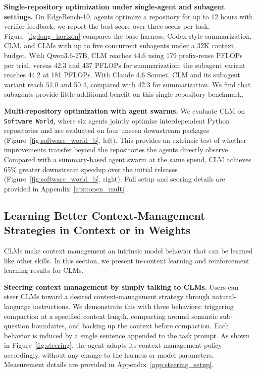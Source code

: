 \documentclass{fairmeta}
\newcommand{\clmhl}[1]{\textcolor{clmblue}{\textbf{#1}}}
\newcommand{\ours}{CLM\xspace}
\newcommand{\oursplural}{CLMs\xspace}
\begin{document}
\textbf{Single-repository optimization under single-agent and subagent settings.}
On EdgeBench-10, agents optimize a repository for up to 12 hours with verifier feedback; we report the best score over three seeds per task. Figure~\ref{fig:long_horizon} compares the base harness, Codex-style summarization, \ours{}, and \oursplural{} with up to five concurrent subagents under a 32K context budget. With Qwen3.6-27B, \ours{} reaches 44.6 using 179 prefix-reuse PFLOPs per trial, versus 42.3 and 437 PFLOPs for summarization; the subagent variant reaches 44.2 at 181 PFLOPs. With Claude 4.6 Sonnet, \ours{} and its subagent variant reach 51.0 and 50.4, compared with 42.3 for summarization. 
We find that subagents provide little additional benefit on this single-repository benchmark.

\textbf{Multi-repository optimization with agent swarms.}
We evaluate \ours{} on \texttt{Software World}, where six agents jointly optimize interdependent Python repositories and are evaluated on four unseen downstream packages (Figure~\ref{fig:software_world_b}, left). This provides an extrinsic test of whether improvements transfer beyond the repositories the agents directly observe. Compared with a summary-based agent swarm at the same spend, \ours{} achieves 65\% greater downstream speedup over the initial releases (Figure~\ref{fig:software_world_b}, right). Full setup and scoring details are provided in Appendix~\ref{app:open_multi}.

\subsection{Learning Better Context-Management Strategies in \clmhl{Context} or in \clmhl{Weights}}
\oursplural make context management an intrinsic model behavior that can be learned like other skills. In this section, we present in-context learning and reinforcement learning results for \oursplural.

\textbf{Steering context management by simply talking to \oursplural.}
Users can steer \oursplural{} toward a desired context-management strategy through natural-language instructions. We demonstrate this with three behaviors: triggering compaction at a specified context length, compacting around semantic sub-question boundaries, and backing up the context before compaction. Each behavior is induced by a single sentence appended to the task prompt. As shown in Figure~\ref{fig:steering}, the agent adapts its context-management policy accordingly, without any change to the harness or model parameters. Measurement details are provided in Appendix~\ref{app:steering_setup}.
\end{document}
